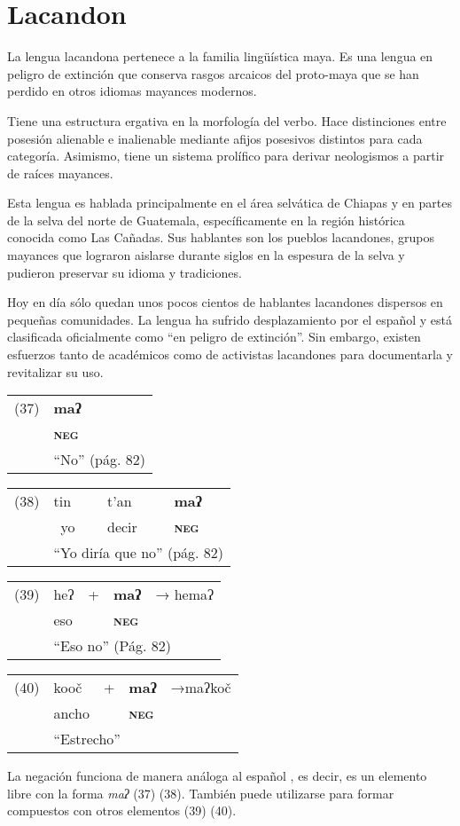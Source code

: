 \section*{Lacandon}

\noindent La lengua lacandona pertenece a la familia lingüística maya. Es una lengua en peligro de extinción que conserva rasgos arcaicos del proto-maya que se han perdido en otros idiomas mayances modernos.

 Tiene una estructura ergativa en la morfología del verbo. Hace distinciones entre posesión alienable e inalienable mediante afijos posesivos distintos para cada categoría. Asimismo, tiene un sistema prolífico para derivar neologismos a partir de raíces mayances.

Esta lengua es hablada principalmente en el área selvática de Chiapas y en partes de la selva del norte de Guatemala, específicamente en la región histórica conocida como Las Cañadas. Sus hablantes son los pueblos lacandones, grupos mayances que lograron aislarse durante siglos en la espesura de la selva y pudieron preservar su idioma y tradiciones.

Hoy en día sólo quedan unos pocos cientos de hablantes lacandones dispersos en pequeñas comunidades. La lengua ha sufrido desplazamiento por el español y está clasificada oficialmente como “en peligro de extinción”. Sin embargo, existen esfuerzos tanto de académicos como de activistas lacandones para documentarla y revitalizar su uso. \vspace{0.5cm}

{\setmainfont{Charis SIL} 
\begin{tabular}{ll}
(37) & \textbf{maʔ}  \\
& \textsc{\textbf{neg}} \\
& ``No'' (pág. 82)
\end{tabular} \vspace{0.5cm}

\begin{tabular}{llll}
(38) & tin & t'an & \textbf{maʔ} \\
& \ yo & decir & \textsc{\textbf{neg}} \\
& \multicolumn{3}{l}{``Yo diría que no'' (pág. 82)}
\end{tabular} \vspace{0.5cm}

\begin{tabular}{lllll}
(39) & heʔ & + & \textbf{maʔ} & → hemaʔ \\
& eso & & \textsc{\textbf{neg}} & \\
& \multicolumn{4}{l}{``Eso no'' (Pág. 82)}
\end{tabular} \vspace{0.5cm}

\begin{tabular}{lllll}
(40) & kooč & + & \textbf{maʔ} & →maʔkoč \\
& ancho & & \textsc{\textbf{neg}} & \\
& \multicolumn{4}{l}{``Estrecho''}
\end{tabular} \vspace{0.5cm}
}

La negación funciona de manera análoga al español \textcolor{MidnightBlue}{\citep{lacandon}}, es decir, es un elemento libre con la forma {\setmainfont{Charis SIL} \textit{maʔ}} (37) (38). También puede utilizarse para formar compuestos con otros elementos (39) (40).